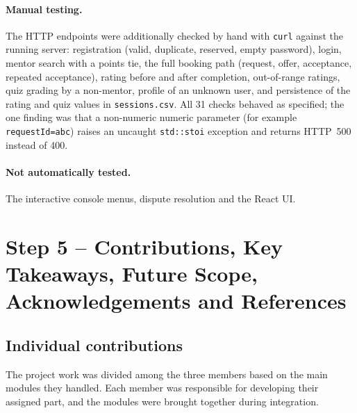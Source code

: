 \documentclass[11pt,a4paper]{article}
\begin{document}
\paragraph{Manual testing.} The HTTP endpoints were additionally checked by hand with \texttt{curl} against the running server: registration (valid, duplicate, reserved, empty password), login, mentor search with a points tie, the full booking path (request, offer, acceptance, repeated acceptance), rating before and after completion, out-of-range ratings, quiz grading by a non-mentor, profile of an unknown user, and persistence of the rating and quiz values in \texttt{sessions.csv}. All 31 checks behaved as specified; the one finding was that a non-numeric numeric parameter (for example \texttt{requestId=abc}) raises an uncaught \texttt{std::stoi} exception and returns HTTP~500 instead of 400.

\paragraph{Not automatically tested.} The interactive console menus, dispute resolution and the React UI.

\section{Step 5 -- Contributions, Key Takeaways, Future Scope, Acknowledgements and References}

\subsection{Individual contributions}

The project work was divided among the three members based on the main modules they handled. Each member was responsible for developing their assigned part, and the modules were brought together during integration.
\end{document}
